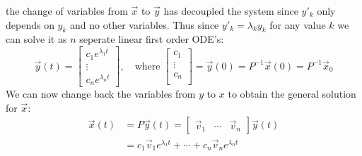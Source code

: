 \documentclass[11pt, a4paper]{article}
\begin{document}
the change of variables from $\vec{x}$ to $\vec{y}$ has decoupled the system since $y'_k$ only depends on $y_k$ and no other variables. Thus since $y'_k = \lambda_k y_k$ for any value $k$ we can solve it as $n$ seperate linear first order ODE's:
\begin{equation*}
  \vec{y}(t) = 
  \begin{bmatrix}
    c_1e^{\lambda_1 t}\\
    \vdots\\
    c_ne^{\lambda_n t}
  \end{bmatrix}, \quad
  \text{where} \;
  \begin{bmatrix}
    c_1\\
    \vdots\\
    c_n\\
  \end{bmatrix}
  = \vec{y}(0) = P^{-1}\vec{x}(0) = P^{-1}\vec{x}_0
\end{equation*}
We can now change back the variables from $y$ to $x$ to obtain the general solution for $\vec{x}$:
\begin{align*}
  \vec{x}(t) &= P\vec{y}(t) = 
  \begin{bmatrix}
    \vec{v}_1 & \cdots & \vec{v}_n
  \end{bmatrix}
  \vec{y}(t)\\
  &= c_1\vec{v}_1e^{\lambda_1 t} + \cdots + c_n\vec{v}_ne^{\lambda_n t}
\end{align*}
\end{document}
